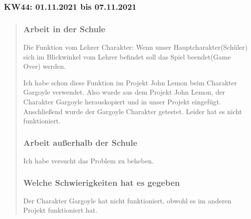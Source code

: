 
\subsubsection{KW44: 01.11.2021 bis 07.11.2021}
\begin{quote}
	\subsubsection*{Arbeit in der Schule}
	Die Funktion vom Lehrer Charakter: Wenn unser Hauptcharakter(Schüler) sich im Blickwinkel vom Lehrer befindet soll das Spiel beendet(Game Over) werden.
	
	 Ich habe schon diese Funktion im Projekt John Lemon beim Charakter Gargoyle verwendet. Also wurde aus dem Projekt John Lemon, der Charakter Gargoyle herauskopiert und in unser Projekt eingefügt. Anschließend wurde der Gargoyle Charakter getestet. Leider hat es nicht funktioniert.
	 
	 \subsubsection*{Arbeit außerhalb der Schule}
	Ich habe versucht das Problem zu beheben.
	
	\subsubsection*{Welche Schwierigkeiten hat es gegeben}
	Der Charakter Gargoyle hat nicht funktioniert, obwohl es im anderen Projekt funktioniert hat.
\end{quote}

